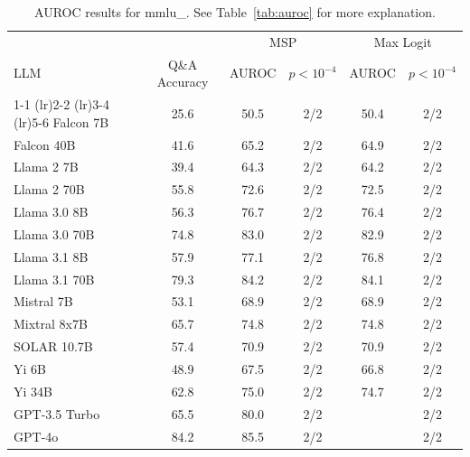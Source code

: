 \begin{table}[h]
\caption{AUROC results for mmlu_. See Table~\ref{tab:auroc} for more explanation.}
\label{tab:auroc_margin}
\centering
\begin{tabular}{lccccc}
\toprule
& & \multicolumn{2}{c}{MSP} & \multicolumn{2}{c}{Max Logit} \\ 
LLM & Q\&A Accuracy & AUROC & $p < 10^{-4}$ & AUROC & $p < 10^{-4}$ \\ 
\cmidrule(lr){1-1} \cmidrule(lr){2-2} \cmidrule(lr){3-4} \cmidrule(lr){5-6} 
Falcon 7B & 25.6 & 50.5 & 2/2 & 50.4 & 2/2\\
Falcon 40B & 41.6 & 65.2 & 2/2 & 64.9 & 2/2\\
Llama 2 7B & 39.4 & 64.3 & 2/2 & 64.2 & 2/2\\
Llama 2 70B & 55.8 & 72.6 & 2/2 & 72.5 & 2/2\\
Llama 3.0 8B & 56.3 & 76.7 & 2/2 & 76.4 & 2/2\\
Llama 3.0 70B & 74.8 & 83.0 & 2/2 & 82.9 & 2/2\\
Llama 3.1 8B & 57.9 & 77.1 & 2/2 & 76.8 & 2/2\\
Llama 3.1 70B & 79.3 & 84.2 & 2/2 & 84.1 & 2/2\\
Mistral 7B & 53.1 & 68.9 & 2/2 & 68.9 & 2/2\\
Mixtral 8x7B & 65.7 & 74.8 & 2/2 & 74.8 & 2/2\\
SOLAR 10.7B & 57.4 & 70.9 & 2/2 & 70.9 & 2/2\\
Yi 6B & 48.9 & 67.5 & 2/2 & 66.8 & 2/2\\
Yi 34B & 62.8 & 75.0 & 2/2 & 74.7 & 2/2\\
GPT-3.5 Turbo & 65.5 & 80.0 & 2/2 &  & 2/2\\
GPT-4o & 84.2 & 85.5 & 2/2 &  & 2/2\\
\bottomrule
\end{tabular}
\end{table}
